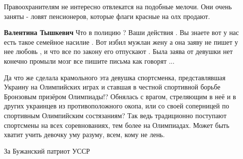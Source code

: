 \begin{itemize}
\begin{itemize}
 
Правоохранителям не интересно отвлекатся на подобные мелочи. Они очень заняты -
ловят пенсионеров, которые флаги красные на олх продают.

 
\textbf{Валентина Тышкевич} Что в полицию ? Ваши действия . Вы знаете вот у нас
есть такое семейное насилие . Вот избил мужлан жену а она заяву не пишет у нее
любовь , и что все по закону его отпускают . Была заява от девушки нет конечно
промыли мозг все пишите письма как говорят ...
\end{itemize}

 

Да что же сделала крамольного эта девушка спортсменка, представлявшая Украину
на Олимпийских играх и ставшая в честной спортивной борьбе Бронзовым призёром
Олимпиады!? Обнялась с врагом, стреляющим в неё и в других украинцев из
противоположного окопа, или со своей соперницей по спортивным Олимпийским
состязаниям? Так ведь традиционно поступают спортсмены на всех соревнованиях,
тем более на Олимпиадах. Может быть хватит учить девочку уму разуму, всем, кому
не лень.


 
За Бужанский патриот УССР \Smiley[1.0][yellow]

\begin{itemize}
 

\end{itemize}
\end{itemize}
